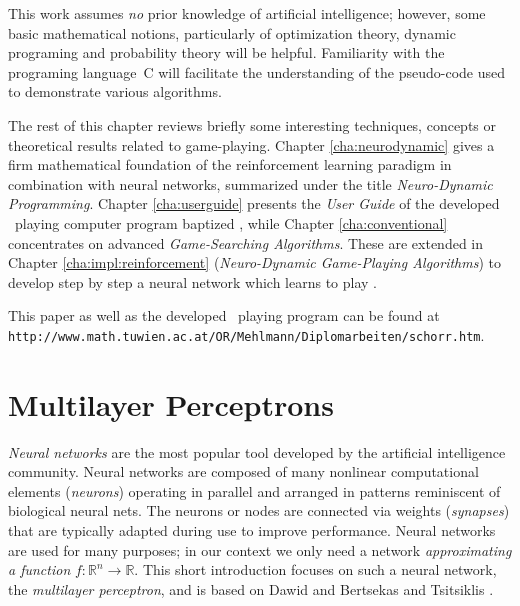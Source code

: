 This work assumes \emph{no} prior knowledge of artificial intelligence; however, some basic mathematical notions, particularly of optimization theory, dynamic programing and probability theory will be helpful. Familiarity with the programing language~C will facilitate the understanding of the pseudo-code used to demonstrate various algorithms.

The rest of this chapter reviews briefly some interesting techniques, concepts or theoretical results related to game-playing. Chapter \ref{cha:neurodynamic} gives a firm mathematical foundation of the reinforcement learning paradigm in combination with neural networks, summarized under the title \emph{Neuro-Dynamic Programming}. Chapter \ref{cha:userguide} presents the \emph{User Guide} of the developed \Abalone\ playing computer program baptized \Malin, while Chapter \ref{cha:conventional} concentrates on advanced \emph{Game-Searching Algorithms}. These are extended in Chapter \ref{cha:impl:reinforcement} (\emph{Neuro-Dynamic Game-Playing Algorithms}) to develop step by step a neural network which learns to play \Abalone.

This paper as well as the developed \Abalone\ playing program can be found at \texttt{http://www.math.tuwien.ac.at/\-OR/\-Mehlmann/\-Diplomarbeiten/\-schorr.htm}.







\section{Multilayer Perceptrons} \label{sec:neuralnetworks}  
\emph{Neural networks} are the most popular tool developed by the artificial intelligence community. Neural networks are composed of many nonlinear computational elements (\emph{neurons}) operating in parallel and arranged in patterns reminiscent of biological neural nets. The neurons or nodes are connected via weights (\emph{synapses}) that are typically adapted during use to improve performance.   Neural networks are used for many purposes; in our context we only need a network \emph{approximating a function} $f:\mathbb{R}^n\rightarrow\mathbb{R}$. This short introduction focuses on such a neural network, the \emph{multilayer perceptron}, and is based on Dawid \cite{Dawid96} and Bertsekas and Tsitsiklis \cite{Bertsekas96}.

